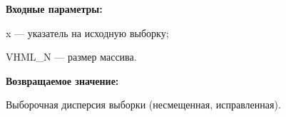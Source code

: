 \textbf{Входные параметры:}
 
x --- указатель на исходную выборку;
 
VHML\_N --- размер массива.

\textbf{Возвращаемое значение:}
 
Выборочная дисперсия выборки (несмещенная, исправленная).